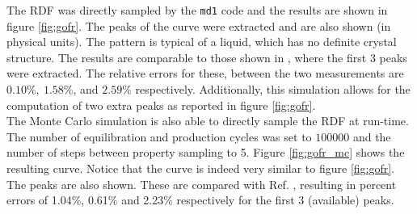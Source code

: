 \documentclass[%
aps,
pra,%
amsmath,amssymb,
preprint,%
reprint,%
notitlepage,
a4paper]{revtex4-1}
\newcommand{\md}{\texttt{md1} }
\begin{document}
The RDF was directly sampled by the \md code and the results are shown in figure \ref{fig:gofr}. The peaks of the curve were extracted  and are also shown (in physical units). The pattern is typical of a liquid, which has no definite crystal structure\cite{Simon2013}. The results are comparable to those shown in \textcite{Rahman1964}, where the first 3 peaks were extracted. The relative errors for these, between the two measurements are $0.10\%,\ 1.58\%$, and $2.59\%$ respectively. Additionally, this simulation allows for the computation of two extra peaks as reported in figure \ref{fig:gofr}.\\
The Monte Carlo simulation is also able to directly sample the RDF at run-time. The number of equilibration and production cycles was set to $\num{100000}$ and the number of steps between property sampling to 5. Figure \ref{fig:gofr_mc} shows the resulting curve. Notice that the curve is indeed very similar to figure \ref{fig:gofr}. The peaks are also shown. These are compared with Ref. \cite{Rahman1964}, resulting in percent errors of 1.04\%, 0.61\% and 2.23\% respectively for the first 3 (available) peaks. 
\end{document}
